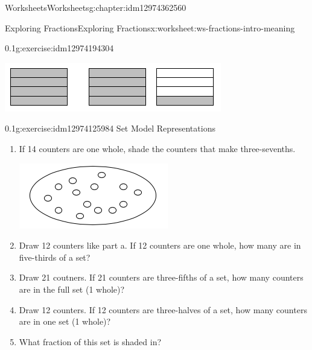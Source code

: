\documentclass[twoside,11pt,]{book}
\begin{document}
\begin{chapterptx}{Worksheets}{}{Worksheets}{}{}{g:chapter:idm12974362560}
\begin{worksheet-section-numberless}{Exploring Fractions}{}{Exploring Fractions}{}{}{x:worksheet:ws-fractions-intro-meaning}
\begin{divisionexercise}{1}{}{0.1}{g:exercise:idm12974194304}
\begin{enumerate}[label=(\alph*)]
\begin{sidebyside}{1}{0.25}{0.25}{0}
\begin{sbspanel}{0.5}
\includegraphics[width=1\linewidth]{images/nine-fourths-vs-twelfths.png}
\end{sbspanel}%
\end{sidebyside}%
%
\end{enumerate}
\end{divisionexercise}%
\begin{divisionexercise}{2}{}{0.1}{g:exercise:idm12974125984}%
Set Model Representations%
%
\begin{enumerate}[label=(\alph*)]
\item{}If 14 counters are one whole, shade the counters that make three-sevenths. \begin{sidebyside}{1}{0.35}{0.35}{0}%
\begin{sbspanel}{0.3}%
\includegraphics[width=1\linewidth]{images/fourteen-counters.png}
\end{sbspanel}%
\end{sidebyside}%
%
\item{}Draw 12 counters like part a. If 12 counters are one whole, how many are in five-thirds of a set?%
\item{}Draw 21 coutners. If 21 counters are three-fifths of a set, how many counters are in the full set (1 whole)?%
\item{}Draw 12 counters. If 12 counters are three-halves of a set, how many counters are in one set (1 whole)?%
\item{}What fraction of this set is shaded in? \begin{sidebyside}{1}{0.35}{0.35}{0}%
\begin{sbspanel}{0.3}%

\end{sbspanel}
\end{sidebyside}
\end{enumerate}
\end{divisionexercise}
\end{worksheet-section-numberless}
\end{chapterptx}
\end{document}
